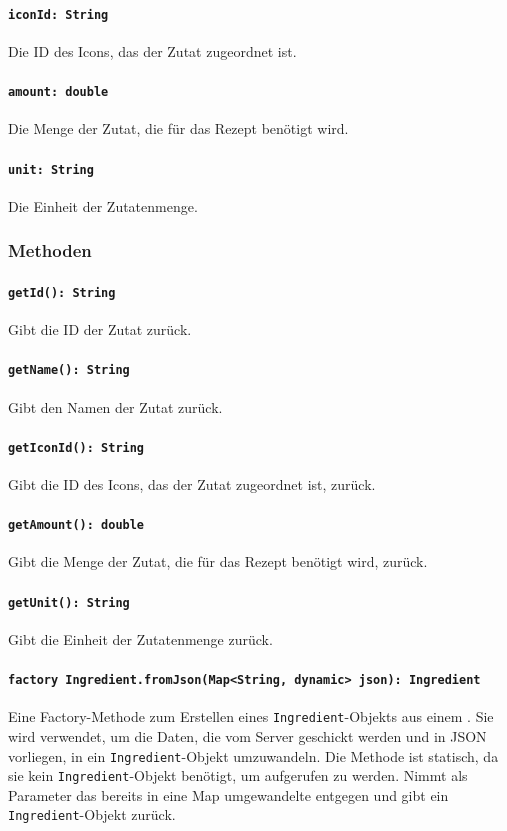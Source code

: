 \documentclass{entwurfsheft}
\begin{document}
\begin{sloppypar}
\paragraph{\texttt{iconId: String}}
Die ID des Icons, das der Zutat zugeordnet ist.
\paragraph{\texttt{amount: double}}
Die Menge der Zutat, die für das Rezept benötigt wird.
\paragraph{\texttt{unit: String}}
Die Einheit der Zutatenmenge.

\subsubsection*{Methoden}
\paragraph{\texttt{getId(): String}}
Gibt die ID der Zutat zurück.
\paragraph{\texttt{getName(): String}}
Gibt den Namen der Zutat zurück.
\paragraph{\texttt{getIconId(): String}}
Gibt die ID des Icons, das der Zutat zugeordnet ist, zurück.
\paragraph{\texttt{getAmount(): double}}
Gibt die Menge der Zutat, die für das Rezept benötigt wird, zurück.
\paragraph{\texttt{getUnit(): String}}
Gibt die Einheit der Zutatenmenge zurück.
\paragraph{\texttt{factory Ingredient.fromJson(Map<String, dynamic> json): Ingredient}}
Eine Factory-Methode zum Erstellen eines \texttt{Ingredient}-Objekts aus einem . Sie wird verwendet, um die Daten, die vom Server geschickt werden und in \Gls{JSON} vorliegen, in ein \texttt{Ingredient}-Objekt umzuwandeln. Die Methode ist statisch, da sie kein \texttt{Ingredient}-Objekt benötigt, um aufgerufen zu werden. Nimmt als Parameter das bereits in eine Map umgewandelte  entgegen und gibt ein \texttt{Ingredient}-Objekt zurück.


\end{sloppypar}
\end{document}
